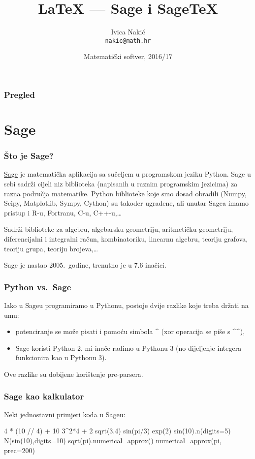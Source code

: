 \documentclass{beamer}
\title{\LaTeX{} --- Sage i Sage\TeX}
\subtitle{}
\author{Ivica Nakić \\ \texttt{nakic@math.hr}}
\institute[PMF--MO]{Matematički odsjek Prirodoslovno--matematičkog fakulteta}
\date[2016/17]{Matematički softver, 2016/17}
\begin{document}
\begin{frame}
  \maketitle
\end{frame}

\begin{frame}
\frametitle{Pregled}
  \tableofcontents
\end{frame}

\section{Sage}

\begin{frame}
\frametitle{Što je Sage?}
\href{http://www.sagemath.org}{Sage} je matematička aplikacija sa sučeljem u programskom jeziku Python. Sage u sebi sadrži cijeli niz biblioteka (napisanih u raznim programskim jezicima) za razna područja matematike. Python biblioteke koje smo dosad obradili (Numpy, Scipy, Matplotlib, Sympy, Cython) su također ugrađene, ali unutar Sagea imamo pristup i R-u, Fortranu, C-u, C++-u,\ldots
\pause

Sadrži biblioteke za algebru, algebarsku geometriju, aritmetičku geometriju, diferencijalni i integralni račun, kombinatoriku, linearnu algebru, teoriju grafova, teoriju grupa, teoriju brojeva,\ldots
\pause

Sage je nastao 2005.\ godine, trenutno je u 7.6 inačici.
\end{frame}

\begin{frame}
\frametitle{Python vs.\ Sage}
Iako u Sageu programiramo u Pythonu, postoje dvije razlike koje treba držati na umu:
\begin{itemize}
     \item potenciranje se može pisati i pomoću simbola \textasciicircum{} (xor operacija se piše s \textasciicircum\textasciicircum),
     \item Sage koristi Python 2, mi inače radimo u Pythonu 3 (no dijeljenje integera funkcionira kao u Pythonu 3).
   \end{itemize}
Ove razlike su dobijene korištenje pre-parsera.

\end{frame}

\begin{frame}[fragile]
\frametitle{Sage kao kalkulator}
Neki jednostavni primjeri koda u Sageu:

\begin{sageblock}
4 * (10 // 4) + 10 %
3^2*4 + 2%
sqrt(3.4)
sin(pi/3)
exp(2)
sin(10).n(digits=5)
N(sin(10),digits=10)
sqrt(pi).numerical_approx()
numerical_approx(pi, prec=200)
\end{sageblock}

\end{frame}
\end{document}
